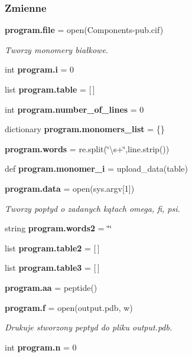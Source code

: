 \subsubsection*{Zmienne}
\begin{DoxyCompactItemize}
\item 
\textbf{ program.\+file} = open(\textquotesingle{}Components-\/pub.\+cif\textquotesingle{})
\begin{DoxyCompactList}\small\item\em Tworzy monomery białkowe. \end{DoxyCompactList}\item 
int \textbf{ program.\+i} = 0
\item 
list \textbf{ program.\+table} = [$\,$]
\item 
int \textbf{ program.\+number\+\_\+of\+\_\+lines} = 0
\item 
dictionary \textbf{ program.\+monomers\+\_\+list} = \{\}
\item 
\textbf{ program.\+words} = re.\+split(\char`\"{}\textbackslash{}s+\char`\"{},line.\+strip())
\item 
def \textbf{ program.\+monomer\+\_\+i} = upload\+\_\+data(table)
\item 
\textbf{ program.\+data} = open(sys.\+argv[1])
\begin{DoxyCompactList}\small\item\em Tworzy poptyd o zadanych kątach omega, fi, psi. \end{DoxyCompactList}\item 
string \textbf{ program.\+words2} = \char`\"{}\char`\"{}
\item 
list \textbf{ program.\+table2} = [$\,$]
\item 
list \textbf{ program.\+table3} = [$\,$]
\item 
\textbf{ program.\+aa} = peptide()
\item 
\textbf{ program.\+f} = open(\textquotesingle{}output.\+pdb\textquotesingle{}, \textquotesingle{}w\textquotesingle{})
\begin{DoxyCompactList}\small\item\em Drukuje stworzony peptyd do pliku output.\+pdb. \end{DoxyCompactList}\item 
int \textbf{ program.\+n} = 0
\end{DoxyCompactItemize}
